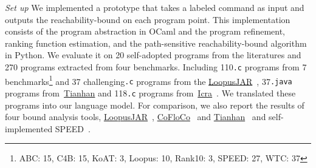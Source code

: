 \emph{Set up} We implemented a prototype {\THESYSTEM} that takes a labeled command as input 
and outputs the reachability-bound on each program point.
This implementation consists of the 
program abstraction in OCaml and the program refinement, ranking function estimation, and the path-sensitive reachability-bound algorithm in Python.
We evaluate it on 20 self-adopted programs from the literatures and 270 programs extracted from four benchmarks. 
Including 110{\tt .c} programs from 7 benchmarks\footnote{ABC: 15, C4B: 15, KoAT: 3, Loopus: 10, Rank10: 3, SPEED: 27, WTC: 37} and 37 challenging{\tt .c} programs 
from the \hyperlink{https://forsyte.at/static/people/sinn/loopusJAR/index.html}{LoopusJAR}~\cite{BenchmarkLoops,SinnZV17},
37{\tt .java} programs from~\hyperlink{https://zenodo.org/record/5140586\#.Y5pBoC-B1QI}{Tianhan}\cite{BenchmarkTianhan,LuCT21}
and 118{\tt .c} programs from~\hyperlink{https://github.com/icra-team/icra}{Icra}~\cite{BenchmarkIcra,KincaidBCR19,CyphertBKR19}.
We translated these programs into our language model.
For comparison, we also report the results of four bound analysis tools, 
\hyperlink{https://forsyte.at/software/loopus/}{LoopusJAR}~\cite{SinnZV17},
\hyperlink{https://github.com/aeflores/CoFloCo/tree/master/src}{CoFloCo}~\cite{ToolCofloco,Montoya17,Flores-Montoya16,Flores-MontoyaH14}
and \hyperlink{https://zenodo.org/record/5140586\#.Y5pBoC-B1QI}{Tianhan}~\cite{BenchmarkTianhan}
and self-implemented SPEED~\cite{GulwaniJK09}.


